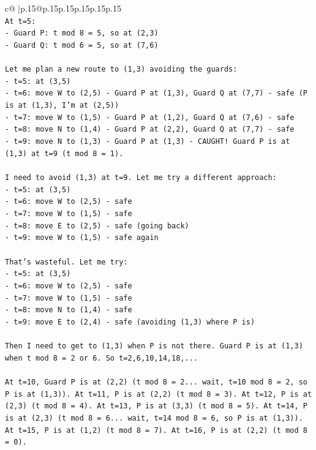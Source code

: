 \documentclass{article}
\begin{document}
{\begin{supertabular}{c@{$\;$}|p{.15\linewidth}@{}p{.15\linewidth}p{.15\linewidth}p{.15\linewidth}p{.15\linewidth}p{.15\linewidth}}
{{{\\ 
\texttt{At t=5:} \\
\texttt{{-} Guard P: t mod 8 = 5, so at (2,3)} \\
\texttt{{-} Guard Q: t mod 6 = 5, so at (7,6)} \\
\\ 
\texttt{Let me plan a new route to (1,3) avoiding the guards:} \\
\texttt{{-} t=5: at (3,5)} \\
\texttt{{-} t=6: move W to (2,5) {-} Guard P at (1,3), Guard Q at (7,7) {-} safe (P is at (1,3), I'm at (2,5))} \\
\texttt{{-} t=7: move W to (1,5) {-} Guard P at (1,2), Guard Q at (7,6) {-} safe} \\
\texttt{{-} t=8: move N to (1,4) {-} Guard P at (2,2), Guard Q at (7,7) {-} safe} \\
\texttt{{-} t=9: move N to (1,3) {-} Guard P at (1,3) {-} CAUGHT! Guard P is at (1,3) at t=9 (t mod 8 = 1).} \\
\\ 
\texttt{I need to avoid (1,3) at t=9. Let me try a different approach:} \\
\texttt{{-} t=5: at (3,5)} \\
\texttt{{-} t=6: move W to (2,5) {-} safe} \\
\texttt{{-} t=7: move W to (1,5) {-} safe} \\
\texttt{{-} t=8: move E to (2,5) {-} safe (going back)} \\
\texttt{{-} t=9: move W to (1,5) {-} safe again} \\
\\ 
\texttt{That's wasteful. Let me try:} \\
\texttt{{-} t=5: at (3,5)} \\
\texttt{{-} t=6: move W to (2,5) {-} safe} \\
\texttt{{-} t=7: move W to (1,5) {-} safe} \\
\texttt{{-} t=8: move N to (1,4) {-} safe} \\
\texttt{{-} t=9: move E to (2,4) {-} safe (avoiding (1,3) where P is)} \\
\\ 
\texttt{Then I need to get to (1,3) when P is not there. Guard P is at (1,3) when t mod 8 = 2 or 6. So t=2,6,10,14,18,...} \\
\\ 
\texttt{At t=10, Guard P is at (2,2) (t mod 8 = 2... wait, t=10 mod 8 = 2, so P is at (1,3)). At t=11, P is at (2,2) (t mod 8 = 3). At t=12, P is at (2,3) (t mod 8 = 4). At t=13, P is at (3,3) (t mod 8 = 5). At t=14, P is at (2,3) (t mod 8 = 6... wait, t=14 mod 8 = 6, so P is at (1,3)). At t=15, P is at (1,2) (t mod 8 = 7). At t=16, P is at (2,2) (t mod 8 = 0).} \\
}}}
\end{supertabular}}
\end{document}
